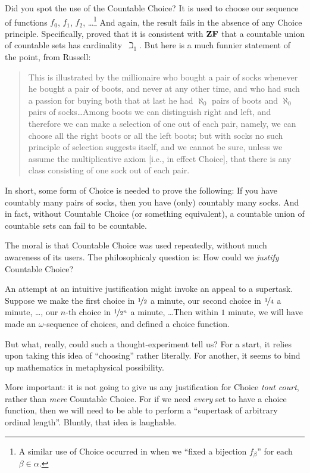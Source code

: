 \documentclass[../../../include/open-logic-section]{subfiles}
\begin{document}
Did you spot the use of the Countable Choice? It is used to choose our
sequence of functions $f_0$, $f_1$, $f_2$, \dots\footnote{A similar
use of Choice occurred in
 when we
``fixed a bijection $f_\beta$'' for each $\beta \in \alpha$.} And
again, the result fails in the absence of any Choice principle.
Specifically, \citet{FefermanLevy1963} proved that it is consistent
with $\mathbf{ZF}$ that a countable union of countable sets has
cardinality~$\beth_1$. But here is a much funnier statement of the
point, from Russell:
\begin{quote}
  This is illustrated by the millionaire who bought a pair of socks
  whenever he bought a pair of boots, and never at any other time, and
  who had such a passion for buying both that at last he had
  $\aleph_0$ pairs of boots and $\aleph_0$ pairs of socks\dots\@ Among
  boots we can distinguish right and left, and therefore we can make a
  selection of one out of each pair, namely, we can choose all the
  right boots or all the left boots; but with socks no such principle
  of selection suggests itself, and we cannot be sure, unless we
  assume the multiplicative axiom [i.e., in effect Choice], that there
  is any class consisting of one sock out of each pair.
  \citep[p.~126]{Russell1919}
\end{quote}
In short, some form of Choice is needed to prove the following: If you
have countably many pairs of socks, then you have (only) countably
many socks. And in fact, without Countable Choice (or something
equivalent), a countable union of countable sets can fail to be
countable. 

The moral is that Countable Choice was used repeatedly, without much
awareness of its users. The philosophicaly question is: How could we
\emph{justify} Countable Choice? 

An attempt at an intuitive justification might invoke an appeal to a
supertask. Suppose we make the first choice in $\nicefrac{1}{2}$ a
minute, our second choice in $\nicefrac{1}{4}$ a minute, \dots, our
$n$-th choice in $\nicefrac{1}{2^n}$ a minute, \dots\@ Then within $1$
minute, we will have made an $\omega$-sequence of choices, and defined
a choice function. 

But what, really, could such a thought-experiment tell us? For a
start, it relies upon taking this idea of ``choosing'' rather
literally. For another, it seems to bind up mathematics in
metaphysical possibility. 

More important: it is not going to give us any justification for
Choice \emph{tout court}, rather than \emph{mere} Countable Choice.
For if we need \emph{every} set to have a choice function, then we will
need to be able to perform a ``supertask of arbitrary ordinal
length''. Bluntly, that idea is laughable.
\end{document}
